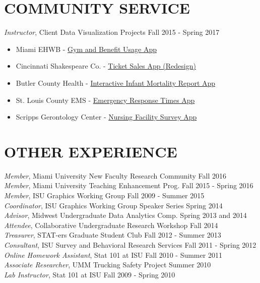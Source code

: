 \documentclass[margin, 10pt]{res}\usepackage[]{graphicx}\usepackage[]{color}
\begin{document}
\begin{resume}
\section{COMMUNITY SERVICE} 
{\it Instructor}, Client Data Visualization Projects \hfill  Fall 2015 - Spring 2017 
\begin{itemize} \itemsep -2pt
\item Miami EHWB - \href{http://dataviz.miamioh.edu/DataVizClassFall2015/MiamiEmployeeHealthApps/EmployeeGymUsage/}{Gym and Benefit Usage App}
\item Cincinnati Shakespeare Co. - \href{http://dataviz.miamioh.edu/Shakespeare/}{Ticket Sales App (Redesign)}
\item Butler County Health - \href{http://dataviz.miamioh.edu/BCH/Butler_County_Infant_Mortality/}{Interactive Infant Mortality Report App}
\item St. Louis County EMS - \href{http://dataviz.miamioh.edu/Minnesota_EMS/}{Emergency Response Times App}
\item Scripps Gerontology Center - \href{http://dataviz.miamioh.edu/DataVizClassFall2015/OhioNursingSurveyApps/EmployeeSafety/}{Nursing Facility Survey App}\\
\end{itemize}


\section{OTHER EXPERIENCE} 

{\it Member}, Miami University New Faculty Research Community \hfill  Fall 2016 \\
{\it Member}, Miami University Teaching Enhancement Prog. \hfill  Fall 2015 - Spring 2016  \\
{\it Member}, ISU Graphics Working Group \hfill  Fall 2009 - Summer 2015  \\
{\it Coordinator}, ISU Graphics Working Group Speaker Series \hfill  Spring 2014  \\
{\it Advisor}, Midwest Undergraduate Data Analytics Comp. \hfill  Spring 2013 and 2014  \\
{\it Attendee}, Collaborative Undergraduate Research Workshop \hfill Fall 2014\\
{\it Treasurer}, STAT-ers Graduate Student Club \hfill  Fall 2012 - Summer 2013 \\
{\it Consultant}, ISU Survey and Behavioral Research Services \hfill Fall 2011 - Spring 2012 \\
{\it Online Homework Assistant}, Stat 101 at ISU \hfill Fall 2010 - Summer 2011 \\
{\it Associate Researcher}, UMM Trucking Safety Project \hfill Summer 2010 \\
{\it Lab Instructor}, Stat 101 at ISU \hfill Fall 2009 - Spring 2010 \\


\end{resume}
\end{document}
